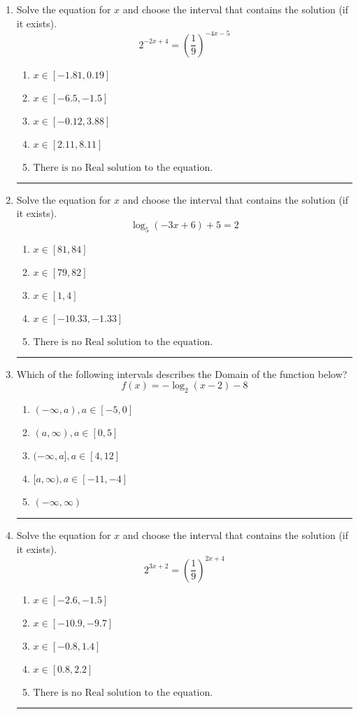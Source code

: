 \documentclass[14pt]{extbook}
\newcommand{\litem}[1]{\item#1\hspace*{-1cm}\rule{\textwidth}{0.4pt}}
\begin{document}
\begin{enumerate}
\litem{
Solve the equation for $x$ and choose the interval that contains the solution (if it exists).\[ 2^{-2x+4} = \left(\frac{1}{9}\right)^{-4x-5} \]\begin{enumerate}[label=\Alph*.]
\item \( x \in [-1.81, 0.19] \)
\item \( x \in [-6.5, -1.5] \)
\item \( x \in [-0.12, 3.88] \)
\item \( x \in [2.11, 8.11] \)
\item \( \text{There is no Real solution to the equation.} \)

\end{enumerate} }
\litem{
Solve the equation for $x$ and choose the interval that contains the solution (if it exists).\[ \log_{5}{(-3x+6)}+5 = 2 \]\begin{enumerate}[label=\Alph*.]
\item \( x \in [81, 84] \)
\item \( x \in [79, 82] \)
\item \( x \in [1, 4] \)
\item \( x \in [-10.33, -1.33] \)
\item \( \text{There is no Real solution to the equation.} \)

\end{enumerate} }
\litem{
Which of the following intervals describes the Domain of the function below?\[ f(x) = -\log_2{(x-2)}-8 \]\begin{enumerate}[label=\Alph*.]
\item \( (-\infty, a), a \in [-5, 0] \)
\item \( (a, \infty), a \in [0, 5] \)
\item \( (-\infty, a], a \in [4, 12] \)
\item \( [a, \infty), a \in [-11, -4] \)
\item \( (-\infty, \infty) \)

\end{enumerate} }
\litem{
Solve the equation for $x$ and choose the interval that contains the solution (if it exists).\[ 2^{3x+2} = \left(\frac{1}{9}\right)^{2x+4} \]\begin{enumerate}[label=\Alph*.]
\item \( x \in [-2.6, -1.5] \)
\item \( x \in [-10.9, -9.7] \)
\item \( x \in [-0.8, 1.4] \)
\item \( x \in [0.8, 2.2] \)
\item \( \text{There is no Real solution to the equation.} \)


\end{enumerate}}
\end{enumerate}
\end{document}
